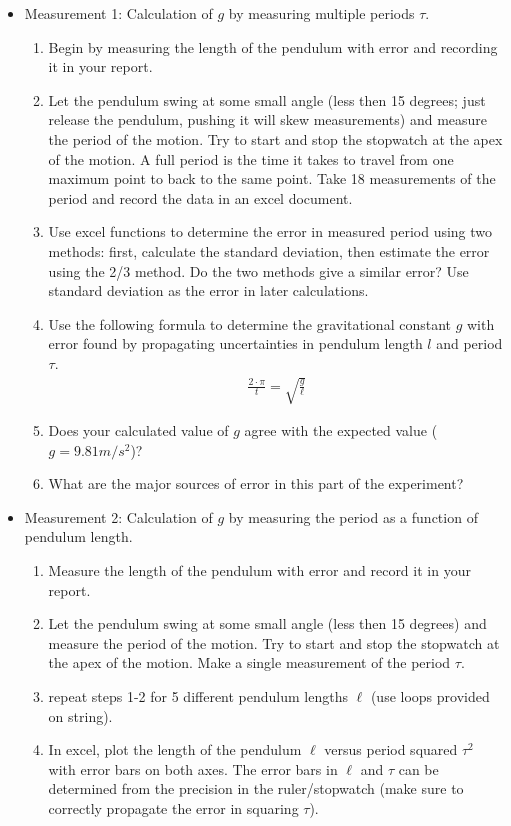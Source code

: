 \begin{itemize}
\item Measurement 1: Calculation of $g$ by measuring multiple periods $\tau$.
\begin{enumerate}
\item Begin by measuring the length of the pendulum with error and recording it in your report.
\item Let the pendulum swing at some small angle (less then 15 degrees; just release the pendulum, pushing it will skew measurements) and measure the period of the motion. Try to start and stop the stopwatch at the apex of the motion. A full period is the time it takes to travel from one maximum point to back to the same point. Take 18 measurements of the period and record the data in an excel document.
\item Use excel functions to determine the error in measured period using two methods: first, calculate the standard deviation, then estimate the error using the 2/3 method. Do the two methods give a similar error? Use standard deviation as the error in later calculations.
\item Use the following formula to determine the gravitational constant $g$ with error found by propagating uncertainties in pendulum length $l$ and period $\tau$.
\begin{gather}
 \frac{2\cdot \pi}{t} = \sqrt{\frac{g}{\ell}}
\end{gather}
\item Does your calculated value of $g$ agree with the expected value ($g=9.81 m/s^2$)?
\item What are the major sources of error in this part of the experiment?
\end{enumerate}
\item Measurement 2: Calculation of $g$ by measuring the period as a function of pendulum length.
\begin{enumerate}
\item Measure the length of the pendulum with error and record it in your report.
\item Let the pendulum swing at some small angle (less then 15 degrees) and measure the period of the motion. Try to start and stop the stopwatch at the apex of the motion. Make a single measurement of the period $\tau$.
\item repeat steps 1-2 for 5 different pendulum lengths $\ell$ (use loops provided on string).
\item In excel, plot the length of the pendulum $\ell$ versus period squared $\tau^2$ with error bars on both axes. The error bars in $\ell$ and $\tau$ can be determined from the precision in the ruler/stopwatch (make sure to correctly propagate the error in squaring $\tau$).

\end{enumerate}
\end{itemize}

